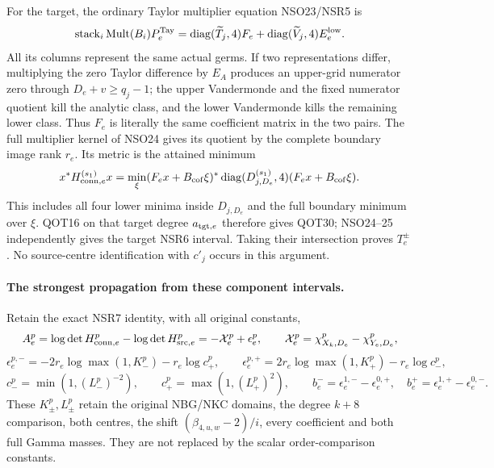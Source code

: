 \documentclass[11pt,a4paper]{article}
\begin{document}
For the target, the ordinary Taylor multiplier equation NSO23/NSR5 is
\[
 \operatorname{stack}_i\operatorname{Mult}(B_i)P_e^{\rm Tay}
 =\operatorname{diag}(\widetilde T_j,4)F_e
       +\operatorname{diag}(\widetilde V_j,4)E_e^{\rm low}.
\]
All its columns represent the same actual germs. If two representations
differ, multiplying the zero Taylor difference by $E_A$ produces an
upper-grid numerator zero through $D_e+v\ge q_j-1$; the upper Vandermonde
and the fixed numerator quotient kill the analytic class, and the lower
Vandermonde kills the remaining lower class. Thus $F_e$ is literally
the same coefficient matrix in the two pairs. The full multiplier kernel
of NSO24 gives its quotient by the complete boundary image rank $r_e$.
Its metric is the attained minimum
\[
 x^*H_{{\rm conn},e}^{(s_1)}x
 =\min_\xi(F_ex+B_{\rm cof}\xi)^*
          \operatorname{diag}(D_{j,D_e}^{(s_1)},4)
                         (F_ex+B_{\rm cof}\xi).
\]
This includes all four lower minima inside $D_{j,D_e}$ and the full
boundary minimum over $\xi$. QOT16 on that target degree
$a_{{\rm tgt},e}$ therefore gives QOT30; NSO24--25 independently gives
the target NSR6 interval. Taking their intersection proves $T_e^\pm$.
No source-centre identification with $c'_j$ occurs in this argument.

\paragraph{The strongest propagation from these component intervals.}
Retain the exact NSR7 identity, with all original constants,
\[
 A_e^p
  =\log\det H_{{\rm conn},e}^p-\log\det H_{{\rm src},e}^p
  =-\mathcal X_e^p+\epsilon_e^p,\qquad
 \mathcal X_e^p=\chi_{X_k,D_e}^p-\chi_{Y_e,D_e}^p ,
\]
\[
 \epsilon_e^{p,-}
 =-2r_e\log\max(1,K_-^p)-r_e\log c_+^p,\qquad
 \epsilon_e^{p,+}
 = 2r_e\log\max(1,K_+^p)-r_e\log c_-^p,
\]
\[
 c_-^p=\min(1,(L_-^p)^{-2}),\qquad
 c_+^p=\max(1,(L_+^p)^2),\qquad
 b_e^-=\epsilon_e^{1,-}-\epsilon_e^{0,+},\quad
 b_e^+=\epsilon_e^{1,+}-\epsilon_e^{0,-}.
\]
These $K_\pm^p,L_\pm^p$ retain the original NBG/NKC domains, the degree
$k+8$ comparison, both centres, the shift
$(\beta_{4,u,w}-2)/i$, every coefficient and both full Gamma masses.
They are not replaced by the scalar order-comparison constants.
\end{document}
